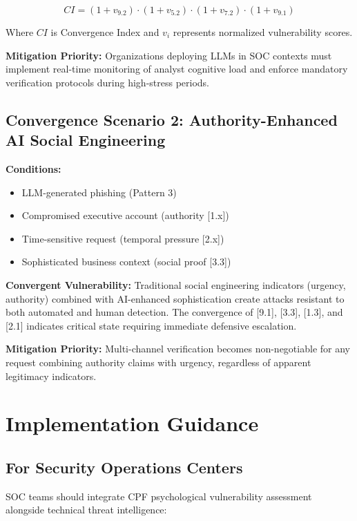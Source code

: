 \documentclass[11pt,a4paper]{article}
\begin{document}
\begin{equation}
CI = (1 + v_{9.2}) \cdot (1 + v_{5.2}) \cdot (1 + v_{7.2}) \cdot (1 + v_{9.1})
\end{equation}

Where $CI$ is Convergence Index and $v_i$ represents normalized vulnerability scores.

\textbf{Mitigation Priority:} Organizations deploying LLMs in SOC contexts must implement real-time monitoring of analyst cognitive load and enforce mandatory verification protocols during high-stress periods.

\subsection{Convergence Scenario 2: Authority-Enhanced AI Social Engineering}

\textbf{Conditions:}
\begin{itemize}
\item LLM-generated phishing (Pattern 3)
\item Compromised executive account (authority [1.x])
\item Time-sensitive request (temporal pressure [2.x])
\item Sophisticated business context (social proof [3.3])
\end{itemize}

\textbf{Convergent Vulnerability:} Traditional social engineering indicators (urgency, authority) combined with AI-enhanced sophistication create attacks resistant to both automated and human detection. The convergence of [9.1], [3.3], [1.3], and [2.1] indicates critical state requiring immediate defensive escalation.

\textbf{Mitigation Priority:} Multi-channel verification becomes non-negotiable for any request combining authority claims with urgency, regardless of apparent legitimacy indicators.

\section{Implementation Guidance}

\subsection{For Security Operations Centers}

SOC teams should integrate CPF psychological vulnerability assessment alongside technical threat intelligence:
\end{document}

